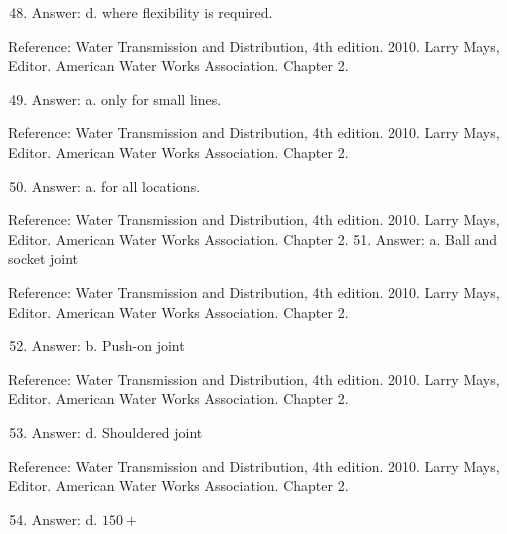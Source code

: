 \documentclass[10pt]{article}
\begin{document}
\begin{enumerate}
  \setcounter{enumi}{47}
  \item Answer: d. where flexibility is required.
\end{enumerate}

Reference: Water Transmission and Distribution, 4th edition. 2010. Larry Mays, Editor. American Water Works Association. Chapter 2.

\begin{enumerate}
  \setcounter{enumi}{48}
  \item Answer: a. only for small lines.
\end{enumerate}

Reference: Water Transmission and Distribution, 4th edition. 2010. Larry Mays, Editor. American Water Works Association. Chapter 2.

\begin{enumerate}
  \setcounter{enumi}{49}
  \item Answer: a. for all locations.
\end{enumerate}

Reference: Water Transmission and Distribution, 4th edition. 2010. Larry Mays, Editor. American Water Works Association. Chapter 2. 51. Answer: a. Ball and socket joint

Reference: Water Transmission and Distribution, 4th edition. 2010. Larry Mays, Editor. American Water Works Association. Chapter 2.

\begin{enumerate}
  \setcounter{enumi}{51}
  \item Answer: b. Push-on joint
\end{enumerate}

Reference: Water Transmission and Distribution, 4th edition. 2010. Larry Mays, Editor. American Water Works Association. Chapter 2.

\begin{enumerate}
  \setcounter{enumi}{52}
  \item Answer: d. Shouldered joint
\end{enumerate}

Reference: Water Transmission and Distribution, 4th edition. 2010. Larry Mays, Editor. American Water Works Association. Chapter 2.

\begin{enumerate}
  \setcounter{enumi}{53}
  \item Answer: d. $150+$
\end{enumerate}
\end{document}
